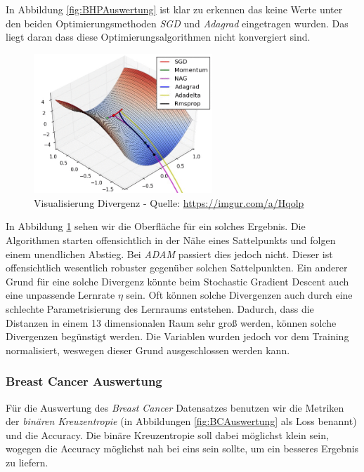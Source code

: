 In Abbildung \ref{fig:BHPAuswertung} ist klar zu erkennen das keine Werte unter 
den beiden Optimierungsmethoden \textit{SGD} und \textit{Adagrad} eingetragen wurden.
Das liegt daran dass diese Optimierungsalgorithmen nicht konvergiert sind. 

\begin{figure}[htbp] 
    \centering
       \includegraphics[width=0.6\textwidth]{abb/VisualizationDivergenz.PNG}
    \caption{Visualisierung Divergenz - Quelle: \url{https://imgur.com/a/Hqolp}}
    \label{fig:Divergenz}
\end{figure}

In Abbildung \ref{fig:Divergenz} sehen wir die Oberfläche für ein solches Ergebnis.
Die Algorithmen starten offensichtlich in der Nähe eines Sattelpunkts und folgen einem
unendlichen Abstieg. Bei \textit{ADAM} passiert dies jedoch nicht. Dieser ist offensichtlich
wesentlich robuster gegenüber solchen Sattelpunkten. 
Ein anderer Grund für eine solche Divergenz könnte beim Stochastic Gradient Descent auch eine 
unpassende Lernrate $\eta$ sein. Oft können solche Divergenzen auch durch eine schlechte 
Parametrisierung des Lernraums entstehen. Dadurch, dass die Distanzen in einem 13 dimensionalen 
Raum sehr groß werden, können solche Divergenzen begünstigt werden. 
Die Variablen wurden jedoch vor dem Training normalisiert, weswegen dieser Grund ausgeschlossen
werden kann. 

\subsubsection{Breast Cancer Auswertung} \label{Breast Cancer Auswertung}

Für die Auswertung des \textit{Breast Cancer} Datensatzes benutzen wir die Metriken 
der \textit{binären Kreuzentropie} (in Abbildungen \ref{fig:BCAuswertung} als Loss benannt)
und die Accuracy. Die binäre Kreuzentropie soll dabei möglichst klein sein, wogegen die Accuracy
möglichst nah bei eins sein sollte, um ein besseres Ergebnis zu liefern.  

